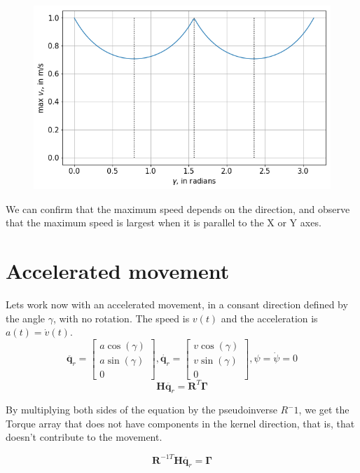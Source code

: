 \documentclass[12pt]{article}
\renewcommand{\vec}[1]{\bm{#1}}
\newcommand{\R}{\mathbb R}
\def\Torque{\vec \Gamma}
\def\R{\vec R}
\def\q{\vec q}
\begin{document}
\begin{figure}[h]
	\centering
	\includegraphics[width=.5\linewidth]{max_vr_gamma}
	\label{fig:max_vr_gamma}
\end{figure}
We can confirm that the maximum speed depends on the direction, and observe that the maximum speed is largest when it is parallel to the X or Y axes.

\section*{Accelerated movement}

Lets work now with an accelerated movement, in a consant direction defined by the angle $\gamma$, with no rotation. The speed is $v(t)$ and the acceleration is $a(t) = \dot{v}(t)$.
$$\ddot{\q_r} = \left[\begin{matrix}a \operatorname{cos}\left(\gamma\right)\\a \operatorname{sin}\left(\gamma\right)\\0\end{matrix}\right],
\dot{\q_r} =  \left[\begin{matrix}v \operatorname{cos}\left(\gamma\right)\\v \operatorname{sin}\left(\gamma\right)\\0\end{matrix}\right], \psi = \dot{\psi} = 0$$
$$\vec H \ddot{\q_r} = \R^T \Torque$$

By multiplying both sides of the equation by the pseudoinverse $R^-1$, we get the Torque array that does not have components in the kernel direction, that is, that doesn't contribute to the movement.

$$ \R^{-1T} \vec H \ddot{\q_r} =\Torque$$
\end{document}
